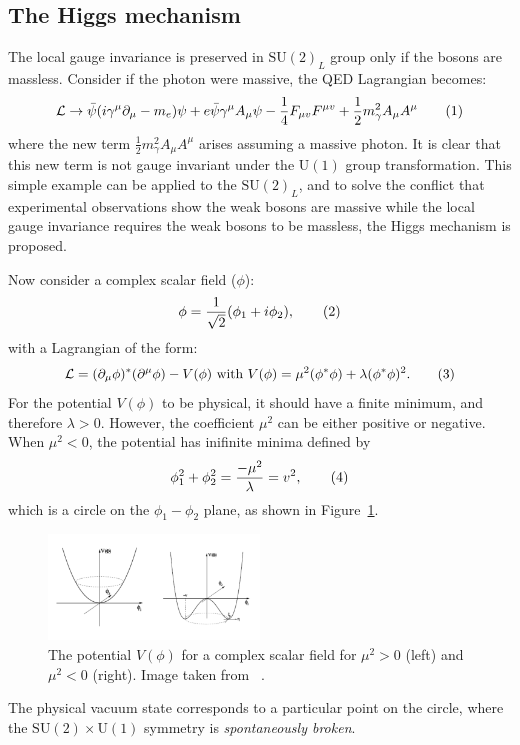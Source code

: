 \subsection{The Higgs mechanism}
\label{sec:SM:Higgs}
The local gauge invariance is preserved in $\text{SU}(2)_L$ group only if
the bosons are massless.
Consider if the photon were massive,  the QED Lagrangian becomes:
\[
    \mathcal{L} \rightarrow \bar{\psi} (i\gamma^\mu \partial_\mu - m_e)\psi 
    + e\bar{\psi}\gamma^\mu A_\mu \psi - \frac{1}{4} F_{\mu v}F^{\mu v} 
    + \frac{1}{2}m^2_\gamma A_\mu A^\mu    
    \addtag \]
where the new term  $\frac{1}{2}m^2_\gamma A_\mu A^\mu$ arises  
assuming a massive photon. It is clear that this new term is not 
gauge invariant under the $\text{U}(1)$ group transformation. 
This simple example can be applied to the $\text{SU}(2)_L$, and to 
solve the conflict that experimental observations show the weak bosons 
are massive while the local gauge invariance requires the weak bosons to be
massless, the Higgs mechanism is proposed. 

Now consider a complex scalar field ($\phi$): 
\[
    \phi = \frac{1}{\sqrt{2}} (\phi_1 + i\phi_2) ,  \addtag \]
with a Lagrangian of the form:
\[\mathcal{L}= (\partial_\mu \phi )^* (\partial^\mu \phi) - V(\phi)\  \text{with}\ 
V(\phi) = \mu^2 (\phi^*\phi) + \lambda (\phi^*\phi)^2.   \addtag \]
For the potential $V(\phi)$ to be physical, it should have a finite minimum, 
and therefore $\lambda>0$.
However, the coefficient $\mu^2$ can be either positive or negative. 
When $\mu^2 < 0$, the potential has inifinite minima defined by 
\[
    \phi_1^2 + \phi_2^2 =  \frac{-\mu^2}{\lambda} = v^2, \addtag \]
which is a circle on the $\phi_1-\phi_2$ plane, as shown in Figure~\ref{fig:SM:potential}.
\begin{figure}[htbp]
    \centering
\includegraphics[width=0.5\textwidth]{Theory/plots/potential.png}
\caption{The potential $V(\phi)$ for a complex scalar field for $\mu^2>0$ (left) and $\mu^2<0$ (right).
Image taken from ~\cite{potential-plot}.}
\label{fig:SM:potential}
\end{figure}
The physical vacuum state corresponds to a particular point on the circle, 
where the  $\text{SU}(2) \times \text{U}(1)$ symmetry is \textit{spontaneously broken}.

